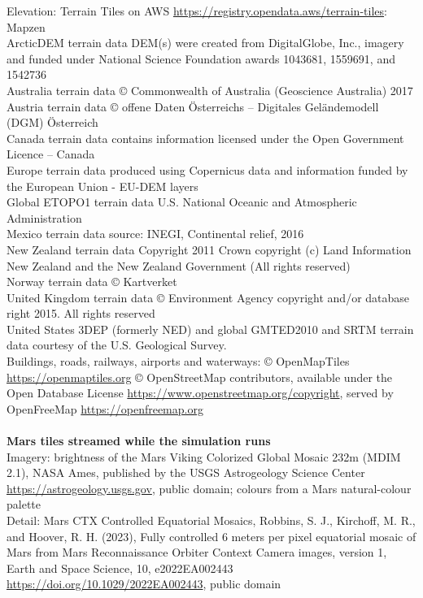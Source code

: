 \documentclass[Orbiter User Manual.tex]{subfiles}
\begin{document}
Elevation: Terrain Tiles on AWS \url{https://registry.opendata.aws/terrain-tiles}: Mapzen\\
ArcticDEM terrain data DEM(s) were created from DigitalGlobe, Inc., imagery and funded under National Science Foundation awards 1043681, 1559691, and 1542736\\
Australia terrain data \copyright{} Commonwealth of Australia (Geoscience Australia) 2017\\
Austria terrain data \copyright{} offene Daten Österreichs -- Digitales Geländemodell (DGM) Österreich\\
Canada terrain data contains information licensed under the Open Government Licence -- Canada\\
Europe terrain data produced using Copernicus data and information funded by the European Union - EU-DEM layers\\
Global ETOPO1 terrain data U.S. National Oceanic and Atmospheric Administration\\
Mexico terrain data source: INEGI, Continental relief, 2016\\
New Zealand terrain data Copyright 2011 Crown copyright (c) Land Information New Zealand and the New Zealand Government (All rights reserved)\\
Norway terrain data \copyright{} Kartverket\\
United Kingdom terrain data \copyright{} Environment Agency copyright and/or database right 2015. All rights reserved\\
United States 3DEP (formerly NED) and global GMTED2010 and SRTM terrain data courtesy of the U.S. Geological Survey.\\
Buildings, roads, railways, airports and waterways: \copyright{} OpenMapTiles \url{https://openmaptiles.org} \copyright{} OpenStreetMap contributors, available under the Open Database License \url{https://www.openstreetmap.org/copyright}, served by OpenFreeMap \url{https://openfreemap.org}\\
\\
\textbf{Mars tiles streamed while the simulation runs}\\
Imagery: brightness of the Mars Viking Colorized Global Mosaic 232m (MDIM 2.1), NASA Ames, published by the USGS Astrogeology Science Center \url{https://astrogeology.usgs.gov}, public domain; colours from a Mars natural-colour palette\\
Detail: Mars CTX Controlled Equatorial Mosaics, Robbins, S. J., Kirchoff, M. R., and Hoover, R. H. (2023), Fully controlled 6 meters per pixel equatorial mosaic of Mars from Mars Reconnaissance Orbiter Context Camera images, version 1, Earth and Space Science, 10, e2022EA002443 \url{https://doi.org/10.1029/2022EA002443}, public domain\\
\end{document}
